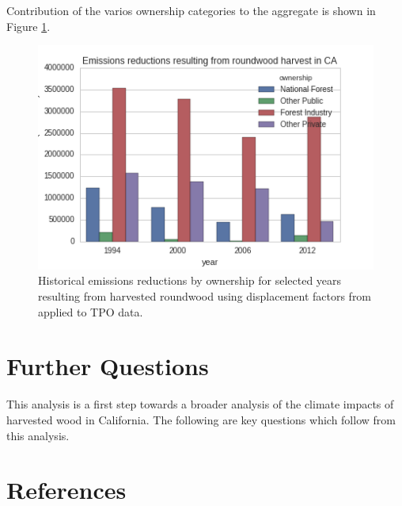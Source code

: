 \documentclass[a4paper]{article}
\begin{document}
Contribution of the varios ownership categories to the aggregate is
shown in Figure \ref{em_reduc_own}.

\begin{figure}[htb]
\centering
\includegraphics[width=.9\linewidth]{./graphics/harv_em_reductions.png}
\caption{\label{em_reduc_own}Historical emissions reductions by ownership for selected years resulting from harvested roundwood using displacement factors from \citep{Sathre2010} applied to TPO data. \label{em_reduc_own}}
\end{figure}

\section{Further Questions}
\label{sec-4}

This analysis is a first step towards a broader analysis of the
climate impacts of harvested wood in California. The following are key
questions which follow from this analysis.

\section{References}
\label{sec-5}


\end{document}
